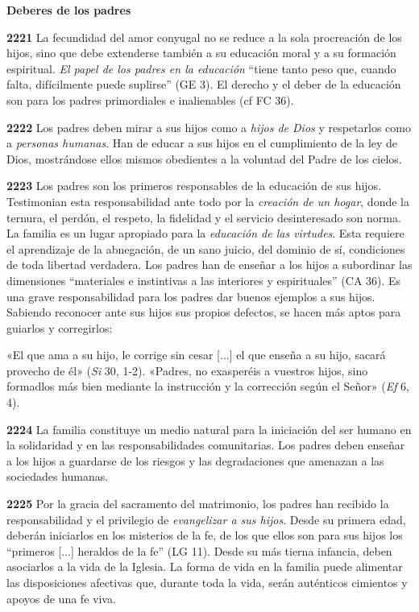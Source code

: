 \documentclass[]{article}
\begin{document}
\textbf{Deberes de los padres}

\textbf{2221} La fecundidad del amor conyugal no se reduce a la sola
procreación de los hijos, sino que debe extenderse también a su
educación moral y a su formación espiritual. \emph{El papel de los
padres en la educación} ``tiene tanto peso que, cuando falta,
difícilmente puede suplirse'' (GE 3). El derecho y el deber de la
educación son para los padres primordiales e inalienables (cf FC 36).

\textbf{2222} Los padres deben mirar a sus hijos como a \emph{hijos de
Dios} y respetarlos como a \emph{personas humanas}. Han de educar a sus
hijos en el cumplimiento de la ley de Dios, mostrándose ellos mismos
obedientes a la voluntad del Padre de los cielos.

\textbf{2223} Los padres son los primeros responsables de la educación
de sus hijos. Testimonian esta responsabilidad ante todo por la
\emph{creación de un hogar}, donde la ternura, el perdón, el respeto, la
fidelidad y el servicio desinteresado son norma. La familia es un lugar
apropiado para la \emph{educación de las virtudes}. Esta requiere el
aprendizaje de la abnegación, de un sano juicio, del dominio de sí,
condiciones de toda libertad verdadera. Los padres han de enseñar a los
hijos a subordinar las dimensiones ``materiales e instintivas a las
interiores y espirituales'' (CA 36). Es una grave responsabilidad para
los padres dar buenos ejemplos a sus hijos. Sabiendo reconocer ante sus
hijos sus propios defectos, se hacen más aptos para guiarlos y
corregirlos:

«El que ama a su hijo, le corrige sin cesar {[}...{]} el que enseña a su
hijo, sacará provecho de él» (\emph{Si} 30, 1-2). «Padres, no exasperéis
a vuestros hijos, sino formadlos más bien mediante la instrucción y la
corrección según el Señor» (\emph{Ef} 6, 4).

\textbf{2224} La familia constituye un medio natural para la iniciación
del ser humano en la solidaridad y en las responsabilidades
comunitarias. Los padres deben enseñar a los hijos a guardarse de los
riesgos y las degradaciones que amenazan a las sociedades humanas.

\textbf{2225} Por la gracia del sacramento del matrimonio, los padres
han recibido la responsabilidad y el privilegio de \emph{evangelizar a
sus hijos}. Desde su primera edad, deberán iniciarlos en los misterios
de la fe, de los que ellos son para sus hijos los ``primeros {[}...{]}
heraldos de la fe'' (LG 11). Desde su más tierna infancia, deben
asociarlos a la vida de la Iglesia. La forma de vida en la familia puede
alimentar las disposiciones afectivas que, durante toda la vida, serán
auténticos cimientos y apoyos de una fe viva.
\end{document}
